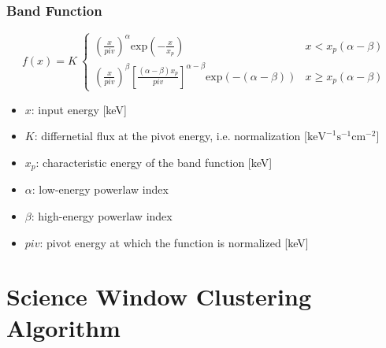 \documentclass{report}
\begin{document}
\subsection*{Band Function}
\begin{equation} \label{eq band func}
  f(x)= K~\begin{cases}\left( \frac{x}{piv} \right)^{\alpha}\text{exp}(-\frac{x}{x_p}) & x < x_{p}(\alpha - \beta) \\ \left( \frac{x}{piv} \right)^{\beta} \left[ \frac{(\alpha - \beta)x_p}{piv}\right]^{\alpha - \beta} \text{exp}(-(\alpha - \beta))& x \ge x_{p}(\alpha - \beta) \end{cases}
\end{equation}

\begin{itemize}
  \item $x$: input energy [keV]
  \item $K$: differnetial flux at the pivot energy, i.e. normalization [$\text{keV}^{-1}\text{s}^{-1}\text{cm}^{-2}$]
  \item $x_p$: characteristic energy of the band function [keV] 
  \item $\alpha$: low-energy powerlaw index
  \item $\beta$: high-energy powerlaw index
  \item $piv$: pivot energy at which the function is normalized [keV]
\end{itemize}

\chapter{Science Window Clustering Algorithm}
\label{Clustering Algorithm}
\end{document}
